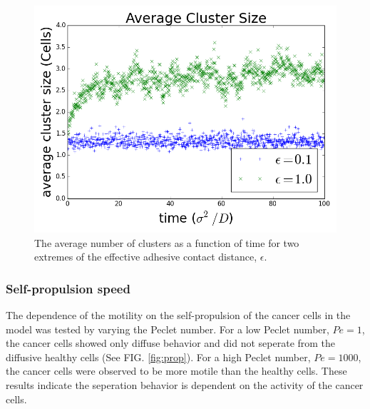 \documentclass[aps,prb,twocolumn,groupedaddress,nofootinbib,floatfix]{revtex4}
\begin{document}
\begin{figure}
  \includegraphics[width=1.0\columnwidth]{images/avg_clusters.png}
  \caption{The average number of clusters as a function of time for two extremes of the effective adhesive contact distance, $\epsilon$.}
  \label{fig:clusters}
\end{figure}


\subsubsection{Self-propulsion speed}

The dependence of the motility on the self-propulsion of the cancer cells in the model was tested by varying the Peclet number.
For a low Peclet number, $Pe=1$, the cancer cells showed only diffuse behavior and did not seperate from the diffusive healthy cells (See FIG. \ref{fig:prop}).
For a high Peclet number, $Pe=1000$, the cancer cells were observed to be more motile than the healthy cells.
These results indicate the seperation behavior is dependent on the activity of the cancer cells.
\end{document}
